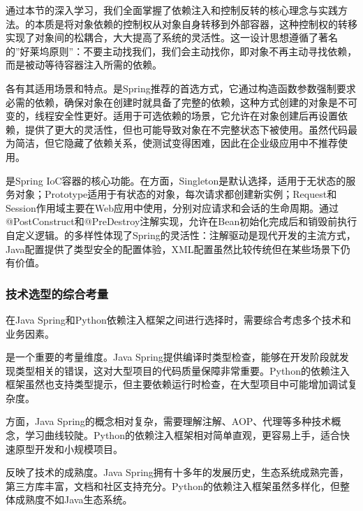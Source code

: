 通过本节的深入学习，我们全面掌握了依赖注入和控制反转的核心理念与实践方法。的本质是将对象依赖的控制权从对象自身转移到外部容器，这种控制权的转移实现了对象间的松耦合，大大提高了系统的灵活性。这一设计思想遵循了著名的''好莱坞原则''：不要主动找我们，我们会主动找你，即对象不再主动寻找依赖，而是被动等待容器注入所需的依赖。

各有其适用场景和特点。是Spring推荐的首选方式，它通过构造函数参数强制要求必需的依赖，确保对象在创建时就具备了完整的依赖，这种方式创建的对象是不可变的，线程安全性更好。适用于可选依赖的场景，它允许在对象创建后再设置依赖，提供了更大的灵活性，但也可能导致对象在不完整状态下被使用。虽然代码最为简洁，但它隐藏了依赖关系，使测试变得困难，因此在企业级应用中不推荐使用。

是Spring IoC容器的核心功能。在方面，Singleton是默认选择，适用于无状态的服务对象；Prototype适用于有状态的对象，每次请求都创建新实例；Request和Session作用域主要在Web应用中使用，分别对应请求和会话的生命周期。通过@PostConstruct和@PreDestroy注解实现，允许在Bean初始化完成后和销毁前执行自定义逻辑。的多样性体现了Spring的灵活性：注解驱动是现代开发的主流方式，Java配置提供了类型安全的配置体验，XML配置虽然比较传统但在某些场景下仍有价值。

\hypertarget{ux6280ux672fux9009ux578bux7684ux7efcux5408ux8003ux91cf}{%
\subsubsection{技术选型的综合考量}\label{ux6280ux672fux9009ux578bux7684ux7efcux5408ux8003ux91cf}}

在Java Spring和Python依赖注入框架之间进行选择时，需要综合考虑多个技术和业务因素。

是一个重要的考量维度。Java Spring提供编译时类型检查，能够在开发阶段就发现类型相关的错误，这对大型项目的代码质量保障非常重要。Python的依赖注入框架虽然也支持类型提示，但主要依赖运行时检查，在大型项目中可能增加调试复杂度。

方面，Java Spring的概念相对复杂，需要理解注解、AOP、代理等多种技术概念，学习曲线较陡。Python的依赖注入框架相对简单直观，更容易上手，适合快速原型开发和小规模项目。

反映了技术的成熟度。Java Spring拥有十多年的发展历史，生态系统成熟完善，第三方库丰富，文档和社区支持充分。Python的依赖注入框架虽然多样化，但整体成熟度不如Java生态系统。

